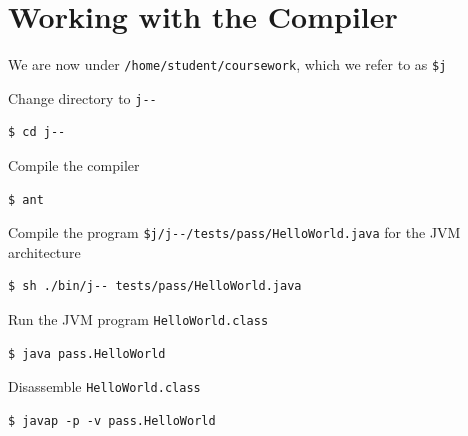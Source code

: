 \documentclass[8pt,a4paper,compress]{beamer}
\begin{document}
\section{Working with the \protect \jmm Compiler}
\begin{frame}[fragile]
\pause\transdissolve

We are now under \lstinline{/home/student/coursework}, which we refer to as \lstinline{$j}

\pause\transdissolve\bigskip

Change directory to \lstinline{j--}

\begin{tcolorbox}[enhanced,drop shadow southwest,sharp corners,size=fbox,colback=black]
\begin{lstlisting}[style=terminal]
$ cd j--
\end{lstlisting}
\end{tcolorbox}

\pause\transdissolve\bigskip

Compile the \jmm compiler

\begin{tcolorbox}[enhanced,drop shadow southwest,sharp corners,size=fbox,colback=black]
\begin{lstlisting}[style=terminal]
$ ant
\end{lstlisting}
\end{tcolorbox}

\pause\transdissolve\bigskip

Compile the \jmm program \lstinline{$j/j--/tests/pass/HelloWorld.java} for the JVM architecture

\begin{tcolorbox}[enhanced,drop shadow southwest,sharp corners,size=fbox,colback=black]
\begin{lstlisting}[style=terminal]
$ sh ./bin/j-- tests/pass/HelloWorld.java
\end{lstlisting}
\end{tcolorbox}

\pause\transdissolve\bigskip

Run the JVM program \lstinline{HelloWorld.class}

\begin{tcolorbox}[enhanced,drop shadow southwest,sharp corners,size=fbox,colback=black]
\begin{lstlisting}[style=terminal]
$ java pass.HelloWorld
\end{lstlisting}
\end{tcolorbox}

\pause\transdissolve\bigskip

Disassemble \lstinline{HelloWorld.class}

\begin{tcolorbox}[enhanced,drop shadow southwest,sharp corners,size=fbox,colback=black]
\begin{lstlisting}[style=terminal]
$ javap -p -v pass.HelloWorld
\end{lstlisting}
\end{tcolorbox}
\end{frame}
\end{document}

